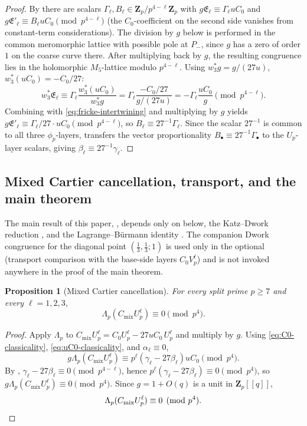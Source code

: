 \documentclass[11pt]{amsart}
\newtheorem{proposition}[theorem]{Proposition}
\theoremstyle{definition}
\theoremstyle{remark}
\newcommand{\Z}{\mathbf{Z}}
\begin{document}
\begin{proof}
By  there are scalars $\Gamma_\ell, B_\ell\in\Z_p/p^{4-\ell}\Z_p$ with $g\mathfrak E_\ell\equiv\Gamma_\ell uC_0$ and $g\mathfrak E'_\ell\equiv B_\ell uC_0\pmod{p^{4-\ell}}$ (the $C_0$-coefficient on the second side vanishes from constant-term considerations). The division by $g$ below is performed in the common meromorphic lattice with possible pole at $P_-$, since $g$ has a zero of order $1$ on the coarse curve there. After multiplying back by $g$, the resulting congruence lies in the holomorphic $M_5$-lattice modulo $p^{4-\ell}$. Using $w_3^*g=g/(27u)$, $w_3^*(uC_0)=-C_0/27$:
\[
w_3^*\mathfrak E_\ell\equiv\Gamma_\ell\frac{w_3^*(uC_0)}{w_3^*g}=\Gamma_\ell\frac{-C_0/27}{g/(27u)}=-\Gamma_\ell\frac{uC_0}{g}\pmod{p^{4-\ell}}.
\]
Combining with \eqref{eq:fricke-intertwining} and multiplying by $g$ yields $g\mathfrak E'_\ell\equiv\Gamma_\ell/27\cdot uC_0\pmod{p^{4-\ell}}$, so $B_\ell\equiv 27^{-1}\Gamma_\ell$. Since the scalar $27^{-1}$ is common to all three $\phi_p$-layers,  transfers the vector proportionality $B_\bullet\equiv 27^{-1}\Gamma_\bullet$ to the $U_p$-layer scalars, giving $\beta_\ell\equiv 27^{-1}\gamma_\ell$.
\end{proof}

\subsection{Mixed Cartier cancellation, transport, and the main theorem}\label{subsec:transport-and-main}

The main result of this paper, , depends only on  below, the Katz--Dwork reduction , and the Lagrange--B\"urmann identity . The companion Dwork congruence \cite[Thm.~7.8]{Shvets-companion} for the diagonal point $(\tfrac13,\tfrac13;1)$ is used only in the optional  (transport comparison with the base-side layers $C_0V_p^\ell$) and is not invoked anywhere in the proof of the main theorem.

\begin{proposition}[Mixed Cartier cancellation]\label{prop:mixed-cartier-cancellation}
For every split prime $p\ge 7$ and every $\ell=1,2,3$,
\[
\Lambda_p(C_{\mathrm{mix}}U_p^\ell)\equiv 0\pmod{p^4}.
\]
\end{proposition}

\begin{proof}
Apply $\Lambda_p$ to $C_{\mathrm{mix}}U_p^\ell=C_0U_p^\ell-27uC_0\,U_p^\ell$ and multiply by $g$. Using \eqref{eq:C0-classicality}, \eqref{eq:uC0-classicality}, and $\alpha_\ell\equiv 0$,
\[
g\Lambda_p(C_{\mathrm{mix}}U_p^\ell)\equiv p^\ell(\gamma_\ell-27\beta_\ell)uC_0\pmod{p^4}.
\]
By , $\gamma_\ell-27\beta_\ell\equiv 0\pmod{p^{4-\ell}}$, hence $p^\ell(\gamma_\ell-27\beta_\ell)\equiv 0\pmod{p^4}$, so $g\Lambda_p(C_{\mathrm{mix}}U_p^\ell)\equiv 0\pmod{p^4}$. Since $g=1+O(q)$ is a unit in $\Z_p[[q]]$,
\[
\Lambda_p(C_{\mathrm{mix}}U_p^\ell)\equiv 0\pmod{p^4}.\qedhere
\]
\end{proof}
\end{document}
